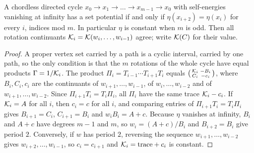 \begin{theorem}\label{thm:set-cycles}
A chordless directed cycle $x_0\to x_1\to\dots\to x_{m-1}\to x_0$ with self-energies vanishing at infinity has a set potential if and only if $\eta(x_{i+2})=\eta(x_i)$ for every $i$, indices mod $m$. In particular $\eta$ is constant when $m$ is odd. Then all rotation continuants $\mathcal{K}_i=\mathcal{K}(w_i,\dots,w_{i-1})$ agree; write $\mathcal{K}(C)$ for their value.
\end{theorem}
\begin{proof}
A proper vertex set carried by a path is a cyclic interval, carried by one path, so the only condition is that the $m$ rotations of the whole cycle have equal products $\Gamma=1/\mathcal{K}_i$. The product $\Pi_i=T_{i-1}\cdots T_{i+1}T_i$ equals $\bigl(\begin{smallmatrix}\mathcal{K}_i&-B_i\\C_i&-c_i\end{smallmatrix}\bigr)$, where $B_i,C_i,c_i$ are the continuants of $w_{i+1},\dots,w_{i-1}$, of $w_i,\dots,w_{i-2}$ and of $w_{i+1},\dots,w_{i-2}$. Since $\Pi_{i+1}T_i=T_i\Pi_i$, all $\Pi_i$ have the same trace $\mathcal{K}_i-c_i$. If $\mathcal{K}_i=A$ for all $i$, then $c_i=c$ for all $i$, and comparing entries of $\Pi_{i+1}T_i=T_i\Pi_i$ gives $B_{i+1}=C_i$, $C_{i+1}=B_i$ and $w_iB_i=A+c$. Because $\eta$ vanishes at infinity, $B_i$ and $A+c$ have degrees $m-1$ and $m$, so $w_i=(A+c)/B_i$ and $B_{i+2}=B_i$ give period $2$. Conversely, if $w$ has period $2$, reversing the sequence $w_{i+1},\dots,w_{i-2}$ gives $w_{i+2},\dots,w_{i-1}$, so $c_i=c_{i+1}$ and $\mathcal{K}_i=\text{trace}+c_i$ is constant.
\end{proof}

